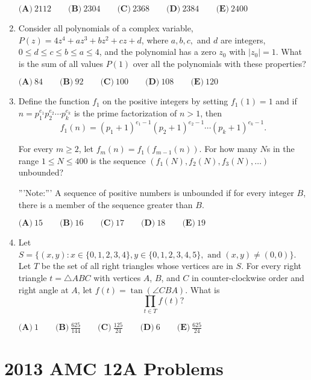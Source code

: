 \documentclass{article}
\begin{document}
\begin{enumerate}[label=\arabic*., itemsep=0.5em]
\(\textbf{(A)}\ 2112\qquad\textbf{(B)}\ 2304\qquad\textbf{(C)}\ 2368\qquad\textbf{(D)}\ 2384\qquad\textbf{(E)}\ 2400\)\par \vspace{0.5em}\item Consider all polynomials of a complex variable, \(P(z)=4z^4+az^3+bz^2+cz+d\), where \(a,b,c,\) and \(d\) are integers, \(0\le d\le c\le b\le a\le 4\), and the polynomial has a zero \(z_0\) with \(|z_0|=1.\) What is the sum of all values \(P(1)\) over all the polynomials with these properties?

\(\textbf{(A)}\ 84\qquad\textbf{(B)}\ 92\qquad\textbf{(C)}\ 100\qquad\textbf{(D)}\ 108\qquad\textbf{(E)}\ 120 \)\par \vspace{0.5em}\item Define the function \(f_1\) on the positive integers by setting \(f_1(1)=1\) and if \(n=p_1^{e_1}p_2^{e_2}\cdots p_k^{e_k}\) is the prime factorization of \(n>1\), then 
\begin{equation*}
f_1(n)=(p_1+1)^{e_1-1}(p_2+1)^{e_2-1}\cdots (p_k+1)^{e_k-1}.
\end{equation*}

For every \(m\ge 2\), let \(f_m(n)=f_1(f_{m-1}(n))\). For how many \(N\)s in the range \(1\le N\le 400\) is the sequence \((f_1(N),f_2(N),f_3(N),\dots )\) unbounded?

'''Note:''' A sequence of positive numbers is unbounded if for every integer \(B\), there is a member of the sequence greater than \(B\).

\(\textbf{(A)}\ 15\qquad\textbf{(B)}\ 16\qquad\textbf{(C)}\ 17\qquad\textbf{(D)}\ 18\qquad\textbf{(E)}\ 19 \)\par \vspace{0.5em}\item Let \(S=\{(x,y) : x\in \{0,1,2,3,4\}, y\in \{0,1,2,3,4,5\},\text{ and } (x,y)\ne (0,0)\}\). 
Let \(T\) be the set of all right triangles whose vertices are in \(S\). For every right triangle \(t=\triangle{ABC}\) with vertices \(A\), \(B\), and \(C\) in counter-clockwise order and right angle at \(A\), let \(f(t)=\tan(\angle{CBA})\). What is 
\begin{equation*}
\prod_{t\in T} f(t)?
\end{equation*}


\(\textbf{(A)}\ 1\qquad\textbf{(B)}\ \frac{625}{144}\qquad\textbf{(C)}\ \frac{125}{24}\qquad\textbf{(D)}\ 6\qquad\textbf{(E)}\ \frac{625}{24} \)\par \vspace{0.5em}
\end{enumerate}
\newpage\section*{2013 AMC 12A Problems}
\end{document}
